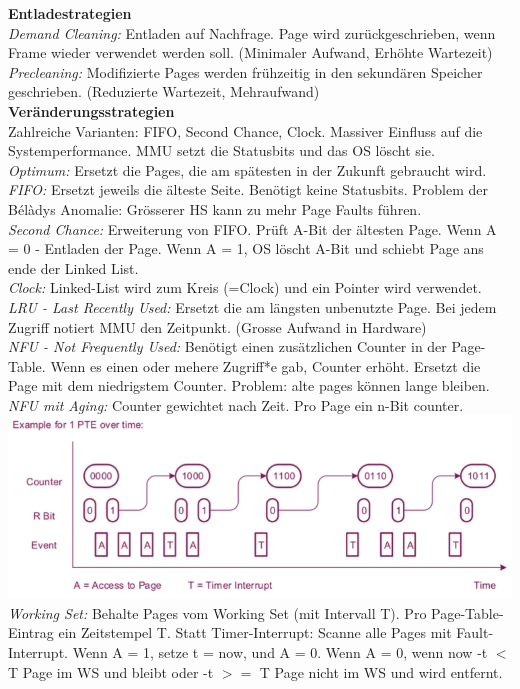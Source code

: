 \documentclass[7pt,landscape,a4paper]{scrartcl}
\begin{document}
\begin{multicols*}{4}
\textbf{Entladestrategien}\\
\textit{Demand Cleaning:} Entladen auf Nachfrage. Page wird zurückgeschrieben, wenn Frame wieder verwendet werden soll. (Minimaler Aufwand, Erhöhte Wartezeit) \textit{Precleaning:} Modifizierte Pages werden frühzeitig in den sekundären Speicher geschrieben. (Reduzierte Wartezeit, Mehraufwand) \\
\textbf{Veränderungsstrategien}\\
Zahlreiche Varianten: FIFO, Second Chance, Clock. Massiver Einfluss auf die Systemperformance. MMU setzt die Statusbits und das OS löscht sie.\\
\textit{Optimum:} Ersetzt die Pages, die am spätesten in der Zukunft gebraucht wird.
\textit{FIFO:} Ersetzt jeweils die älteste Seite. Benötigt keine Statusbits. Problem der Bélàdys Anomalie: Grösserer HS kann zu mehr Page Faults führen.\\
\textit{Second Chance:} Erweiterung von FIFO. Prüft A-Bit der ältesten Page. Wenn A = 0 - Entladen der Page. Wenn A = 1, OS löscht A-Bit und schiebt Page ans ende der Linked List.\\
\textit{Clock:} Linked-List wird zum Kreis (=Clock) und ein Pointer wird verwendet.\\
\textit{LRU - Last Recently Used:} Ersetzt die am längsten unbenutzte Page. Bei jedem Zugriff notiert MMU den Zeitpunkt.  (Grosse Aufwand in Hardware)\\
\textit{NFU - Not Frequently Used:} Benötigt einen zusätzlichen Counter in der Page-Table. Wenn es einen oder mehere Zugriff*e gab, Counter erhöht. Ersetzt die Page mit dem niedrigstem Counter. Problem: alte pages können lange bleiben.\\
\textit{NFU mit Aging:} Counter gewichtet nach Zeit. Pro Page ein n-Bit counter.\\
\includegraphics[width=\linewidth]{nfuaging}
\textit{Working Set:} Behalte Pages vom Working Set (mit Intervall T). Pro Page-Table-Eintrag ein Zeitstempel T. Statt Timer-Interrupt: Scanne alle Pages mit Fault-Interrupt. Wenn A = 1, setze t = now, und A = 0. Wenn A = 0, wenn now -t $<$T Page im WS und bleibt oder -t $>=$ T Page nicht im WS und wird entfernt.\\

\end{multicols*}
\end{document}
